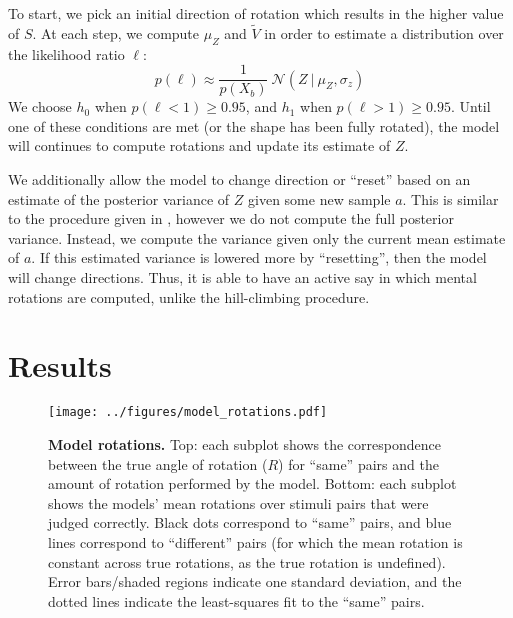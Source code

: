\documentclass{article} %
\begin{document}
To start, we pick an initial direction of rotation which results in
the higher value of $S$. At each step, we compute $\mu_Z$ and
$\tilde{V}$ in order to estimate a distribution over the likelihood
ratio $\ell$:
\begin{equation*}
p(\ell)\approx\frac{1}{p(X_b)}\ \mathcal{N}(Z\ \vert\ \mu_Z, \sigma_z)
\end{equation*}
We choose $h_0$ when $p(\ell < 1)\geq 0.95$, and $h_1$ when $p(\ell >
1)\geq 0.95$. Until one of these conditions are met (or the shape has
been fully rotated), the model will continues to compute rotations and
update its estimate of $Z$. 

We additionally allow the model to change direction or ``reset'' based
on an estimate of the posterior variance of $Z$ given some new sample
$a$. This is similar to the procedure given in \cite{Osborne:2012tm},
however we do not compute the full posterior variance. Instead, we
compute the variance given only the current mean estimate of $a$. If
this estimated variance is lowered more by ``resetting'', then the
model will change directions. Thus, it is able to have an active say
in which mental rotations are computed, unlike the hill-climbing
procedure.


\section{Results}

\begin{figure}[t]
  \centering
  \texttt{[image: ../figures/model\_rotations.pdf]}
  \caption{\textbf{Model rotations.} Top: each subplot shows the
    correspondence between the true angle of rotation ($R$) for
    ``same'' pairs and the amount of rotation performed by the
    model. Bottom: each subplot shows the models' mean rotations over
    stimuli pairs that were judged correctly. Black dots correspond to
    ``same'' pairs, and blue lines correspond to ``different'' pairs
    (for which the mean rotation is constant across true rotations, as
    the true rotation is undefined). Error bars/shaded regions
    indicate one standard deviation, and the dotted lines indicate the
    least-squares fit to the ``same'' pairs.}
  \label{fig:rotations}
\end{figure}
\end{document}
